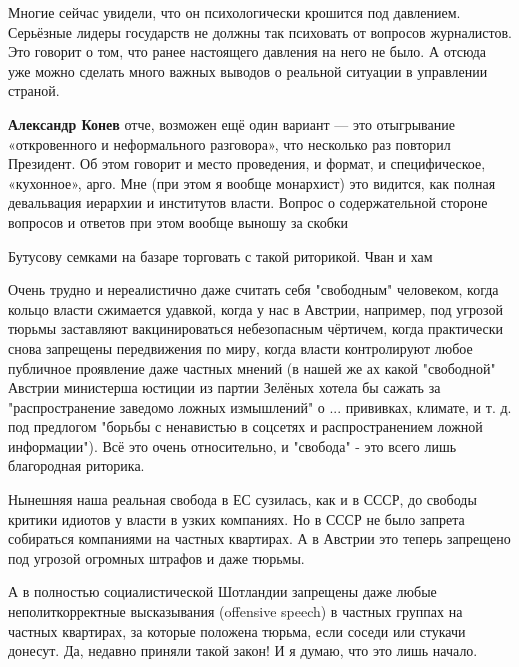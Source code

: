 \begin{itemize}

Многие сейчас увидели, что он психологически крошится под давлением. Серьёзные
лидеры государств не должны так психовать от вопросов журналистов. Это говорит
о том, что ранее настоящего давления на него не было. А отсюда уже можно
сделать много важных выводов о реальной ситуации в управлении страной.

\begin{itemize} %
\textbf{Александр Конев} отче, возможен ещё один вариант — это отыгрывание «откровенного и неформального разговора», что несколько раз повторил Президент. Об этом говорит и место проведения, и формат, и специфическое, «кухонное», арго. Мне (при этом я вообще монархист) это видится, как полная девальвация иерархии и институтов власти. Вопрос о содержательной стороне вопросов и ответов при этом вообще выношу за скобки
\end{itemize} %

Бутусову семками на базаре торговать с такой риторикой. Чван и хам


Очень трудно и нереалистично даже считать себя "свободным" человеком, когда
кольцо власти сжимается удавкой, когда у нас в Австрии, например, под угрозой
тюрьмы заставляют вакцинироваться небезопасным чёртичем, когда практически
снова запрещены передвижения по миру, когда власти контролируют любое публичное
проявление даже частных мнений (в нашей же ах какой "свободной" Австрии
министерша юстиции из партии Зелёных хотела бы сажать за "распространение
заведомо ложных измышлений" о ... прививках, климате, и т. д. под предлогом
"борьбы с ненавистью в соцсетях и распространением ложной информации"). Всё это
очень относительно, и "свобода" - это всего лишь благородная риторика.

Нынешняя наша реальная свобода в ЕС сузилась, как и в СССР, до свободы критики
идиотов у власти в узких компаниях. Но в СССР не было запрета собираться
компаниями на частных квартирах. А в Австрии это теперь запрещено под угрозой
огромных штрафов и даже тюрьмы. 

А в полностью социалистической Шотландии запрещены даже любые неполиткорректные
высказывания (offensive speech) в частных группах на частных квартирах, за
которые положена тюрьма, если соседи или стукачи донесут. Да, недавно приняли
такой закон! И я думаю, что это лишь начало.

\begin{itemize} %


\end{itemize}
\end{itemize}
